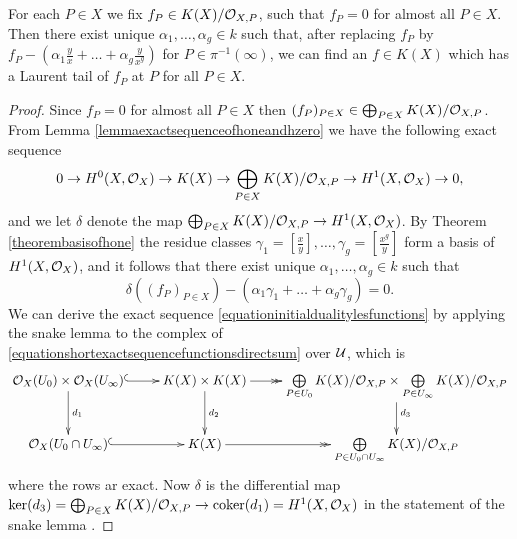     \begin{cor}
    For each $P \in X$ we fix $f_P \in K(X)/{\cal O}_{X,P}$, such that $f_P = 0$ for almost all $P \in X$.
    Then there exist unique $\alpha_1, \ldots, \alpha_g \in k$ such that, after replacing $f_P$ by $f_P - \left( \alpha_1 \frac{y}{x} + \ldots + \alpha_g \frac{y}{x^g}\right)$ for $P \in \pi^{-1}(\infty)$, we can find an $f \in K(X)$ which has a Laurent tail of $f_P$ at $P$ for all $P \in X$.
    \end{cor}
    \begin{proof}
    Since $f_P = 0$ for almost all $P \in X$ then $(f_P)_{P \in X} \in \bigoplus_{P \in X} K(X)/{\cal O}_{X,P}$.
    From Lemma \ref{lemmaexactsequenceofhoneandhzero} we have the following exact sequence
        \begin{equation*}
        0 \rightarrow H^0(X,{\cal O}_X) \rightarrow K(X) \rightarrow \bigoplus_{P \in X} K(X)/{\cal O}_{X,P} \rightarrow H^1(X,\mathcal{O}_X) \rightarrow 0,
        \end{equation*}
    and we let $\delta$ denote the map $\bigoplus_{P \in X} K(X)/{\cal O}_{X,P} \rightarrow H^1(X,\mathcal{O}_X)$.
    By Theorem \ref{theorembasisofhone} the residue classes $ \gamma_ 1= \left[ \frac{x}{y}\right], \ldots, \gamma_g = \left[\frac{x^g}{y}\right]$ form a basis of $H^1(X,\mathcal{O}_X)$, and it follows that there exist unique $\alpha_1, \ldots, \alpha_g \in k$ such that
        \[
        \delta\left( (f_P)_{P \in X} \right) - \left( \alpha_1\gamma_1 + \ldots + \alpha_g\gamma_g \right) = 0.
        \]
    We can derive the exact sequence \eqref{equationinitialdualitylesfunctions} by applying the snake lemma to the \cech complex of \eqref{equationshortexactsequencefunctionsdirectsum} over ${\mathcal U}$, which is
        \begin{equation*}
        \xymatrix{\cO_X(U_0)\times\cO_X(U_\infty) \ar@{^{(}->}[r] \ar[d]^{d_1} & K(X) \times K(X) \ar[d]^{d_2} \ar@{->>}[r] & \bigoplus \limits_{P \in U_0} K(X)/\cO_{X,P} \times \bigoplus \limits_{P \in U_\infty} K(X)/\cO_{X,P} \ar[d]^{d_3} \\
        \cO_X(U_0 \cap U_\infty) \ar@{^{(}->}[r]  & K(X) \ar@{->>}[r] & \bigoplus \limits_{P\in U_0 \cap U_\infty} K(X)/\cO_{X,P} }
        \end{equation*}
        where the rows ar exact. 
    Now $\delta$ is the differential map $\ker(d_3) = \bigoplus_{P \in X}K(X)/{\cal O}_{X,P} \rightarrow \operatorname{coker}(d_1) = H^1(X,\mathcal{O}_X)$ in the statement of the snake lemma \cite[Lem.\ 1.3.2]{weibel}.

\end{proof}

